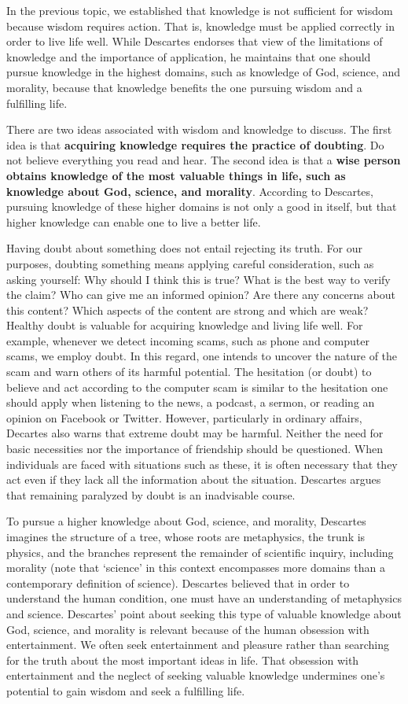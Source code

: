 \documentclass[
]{book}
\begin{document}
In the previous topic, we established that knowledge is not sufficient for wisdom because wisdom requires action. That is, knowledge must be applied correctly in order to live life well. While Descartes endorses that view of the limitations of knowledge and the importance of application, he maintains that one should pursue knowledge in the highest domains, such as knowledge of God, science, and morality, because that knowledge benefits the one pursuing wisdom and a fulfilling life.

There are two ideas associated with wisdom and knowledge to discuss. The first idea is that \textbf{acquiring knowledge requires the practice of doubting}. Do not believe everything you read and hear. The second idea is that a \textbf{wise person obtains knowledge of the most valuable things in life, such as knowledge about God, science, and morality}. According to Descartes, pursuing knowledge of these higher domains is not only a good in itself, but that higher knowledge can enable one to live a better life.

Having doubt about something does not entail rejecting its truth. For our purposes, doubting something means applying careful consideration, such as asking yourself: Why should I think this is true? What is the best way to verify the claim? Who can give me an informed opinion? Are there any concerns about this content? Which aspects of the content are strong and which are weak? Healthy doubt is valuable for acquiring knowledge and living life well. For example, whenever we detect incoming scams, such as phone and computer scams, we employ doubt. In this regard, one intends to uncover the nature of the scam and warn others of its harmful potential. The hesitation (or doubt) to believe and act according to the computer scam is similar to the hesitation one should apply when listening to the news, a podcast, a sermon, or reading an opinion on Facebook or Twitter. However, particularly in ordinary affairs, Decartes also warns that extreme doubt may be harmful. Neither the need for basic necessities nor the importance of friendship should be questioned. When individuals are faced with situations such as these, it is often necessary that they act even if they lack all the information about the situation. Descartes argues that remaining paralyzed by doubt is an inadvisable course.

To pursue a higher knowledge about God, science, and morality, Descartes imagines the structure of a tree, whose roots are metaphysics, the trunk is physics, and the branches represent the remainder of scientific inquiry, including morality (note that `science' in this context encompasses more domains than a contemporary definition of science). Descartes believed that in order to understand the human condition, one must have an understanding of metaphysics and science. Descartes' point about seeking this type of valuable knowledge about God, science, and morality is relevant because of the human obsession with entertainment. We often seek entertainment and pleasure rather than searching for the truth about the most important ideas in life. That obsession with entertainment and the neglect of seeking valuable knowledge undermines one's potential to gain wisdom and seek a fulfilling life.
\end{document}
